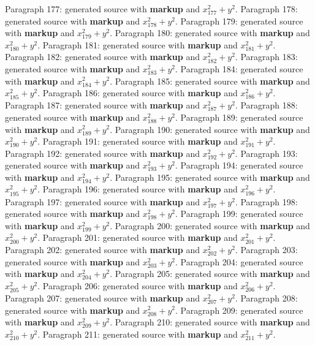 \documentclass{article}
\begin{document}
Paragraph 177: generated source with \textbf{markup} and $x_{177}^2 + y^2$.
Paragraph 178: generated source with \textbf{markup} and $x_{178}^2 + y^2$.
Paragraph 179: generated source with \textbf{markup} and $x_{179}^2 + y^2$.
Paragraph 180: generated source with \textbf{markup} and $x_{180}^2 + y^2$.
Paragraph 181: generated source with \textbf{markup} and $x_{181}^2 + y^2$.
Paragraph 182: generated source with \textbf{markup} and $x_{182}^2 + y^2$.
Paragraph 183: generated source with \textbf{markup} and $x_{183}^2 + y^2$.
Paragraph 184: generated source with \textbf{markup} and $x_{184}^2 + y^2$.
Paragraph 185: generated source with \textbf{markup} and $x_{185}^2 + y^2$.
Paragraph 186: generated source with \textbf{markup} and $x_{186}^2 + y^2$.
Paragraph 187: generated source with \textbf{markup} and $x_{187}^2 + y^2$.
Paragraph 188: generated source with \textbf{markup} and $x_{188}^2 + y^2$.
Paragraph 189: generated source with \textbf{markup} and $x_{189}^2 + y^2$.
Paragraph 190: generated source with \textbf{markup} and $x_{190}^2 + y^2$.
Paragraph 191: generated source with \textbf{markup} and $x_{191}^2 + y^2$.
Paragraph 192: generated source with \textbf{markup} and $x_{192}^2 + y^2$.
Paragraph 193: generated source with \textbf{markup} and $x_{193}^2 + y^2$.
Paragraph 194: generated source with \textbf{markup} and $x_{194}^2 + y^2$.
Paragraph 195: generated source with \textbf{markup} and $x_{195}^2 + y^2$.
Paragraph 196: generated source with \textbf{markup} and $x_{196}^2 + y^2$.
Paragraph 197: generated source with \textbf{markup} and $x_{197}^2 + y^2$.
Paragraph 198: generated source with \textbf{markup} and $x_{198}^2 + y^2$.
Paragraph 199: generated source with \textbf{markup} and $x_{199}^2 + y^2$.
Paragraph 200: generated source with \textbf{markup} and $x_{200}^2 + y^2$.
Paragraph 201: generated source with \textbf{markup} and $x_{201}^2 + y^2$.
Paragraph 202: generated source with \textbf{markup} and $x_{202}^2 + y^2$.
Paragraph 203: generated source with \textbf{markup} and $x_{203}^2 + y^2$.
Paragraph 204: generated source with \textbf{markup} and $x_{204}^2 + y^2$.
Paragraph 205: generated source with \textbf{markup} and $x_{205}^2 + y^2$.
Paragraph 206: generated source with \textbf{markup} and $x_{206}^2 + y^2$.
Paragraph 207: generated source with \textbf{markup} and $x_{207}^2 + y^2$.
Paragraph 208: generated source with \textbf{markup} and $x_{208}^2 + y^2$.
Paragraph 209: generated source with \textbf{markup} and $x_{209}^2 + y^2$.
Paragraph 210: generated source with \textbf{markup} and $x_{210}^2 + y^2$.
Paragraph 211: generated source with \textbf{markup} and $x_{211}^2 + y^2$.
\end{document}

